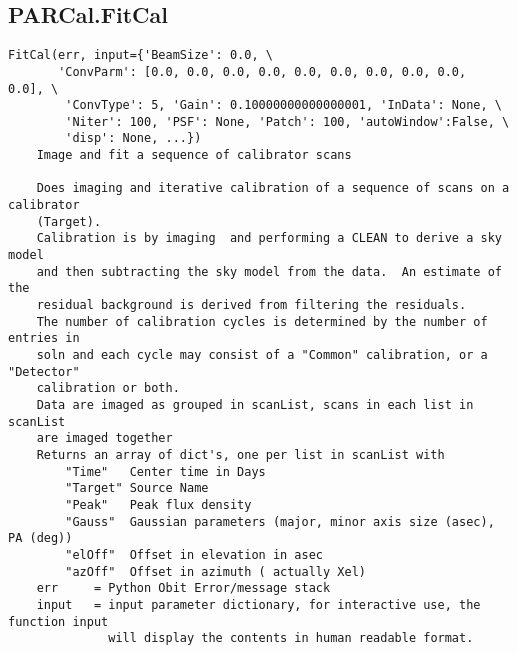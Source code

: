 \documentclass[11pt]{report}
\begin{document}
\subsection{PARCal.FitCal}
\begin{verbatim}
FitCal(err, input={'BeamSize': 0.0, \
       'ConvParm': [0.0, 0.0, 0.0, 0.0, 0.0, 0.0, 0.0, 0.0, 0.0,  0.0], \
        'ConvType': 5, 'Gain': 0.10000000000000001, 'InData': None, \
        'Niter': 100, 'PSF': None, 'Patch': 100, 'autoWindow':False, \
        'disp': None, ...})
    Image and fit a sequence of calibrator scans
    
    Does imaging and iterative calibration of a sequence of scans on a calibrator
    (Target).
    Calibration is by imaging  and performing a CLEAN to derive a sky model
    and then subtracting the sky model from the data.  An estimate of the
    residual background is derived from filtering the residuals.
    The number of calibration cycles is determined by the number of entries in
    soln and each cycle may consist of a "Common" calibration, or a "Detector"
    calibration or both.
    Data are imaged as grouped in scanList, scans in each list in scanList
    are imaged together
    Returns an array of dict's, one per list in scanList with
        "Time"   Center time in Days
        "Target" Source Name
        "Peak"   Peak flux density
        "Gauss"  Gaussian parameters (major, minor axis size (asec), PA (deg))
        "elOff"  Offset in elevation in asec
        "azOff"  Offset in azimuth ( actually Xel)
    err     = Python Obit Error/message stack
    input   = input parameter dictionary, for interactive use, the function input
              will display the contents in human readable format.
    

\end{verbatim}
\end{document}
